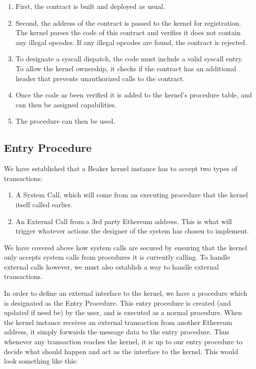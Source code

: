 \documentclass[english,a4paper]{article}
\begin{document}
\begin{enumerate}
\def\labelenumi{\arabic{enumi}.}
\item
  First, the contract is built and deployed as usual.
\item
  Second, the address of the contract is passed to the kernel for registration.
  The kernel parses the code of this contract and verifies it does not contain
  any illegal opcodes. If any illegal opcodes are found, the contract is
  rejected.
\item
  To designate a syscall dispatch, the code must include a valid syscall
  entry. To allow the kernel ownership, it checks if the contract has an
  additional header that prevents unauthorized calls to the contract.
\item
  Once the code as been verified it is added to the kernel's procedure table,
  and can then be assigned capabilities.
\item
  The procedure can then be used.
\end{enumerate}

\subsection{Entry Procedure}\label{entry-procedure}
We have established that a Beaker kernel instance has to accept two
types of transactions:

\begin{enumerate}
\def\labelenumi{\arabic{enumi}.}
\item
  A System Call, which will come from an executing procedure that the
  kernel itself called earlier.
\item
  An External Call from a 3rd party Ethereum address. This is what will
  trigger whatever actions the designer of the system has chosen to
  implement.
\end{enumerate}

We have covered above how system calls are secured by ensuring that the
kernel only accepts system calls from procedures it is currently
calling. To handle external calls however, we must also establish a way
to handle external transactions.

In order to define an external interface to the kernel, we have a
procedure which is designated as the Entry Procedure. This entry
procedure is created (and updated if need be) by the user, and is
executed as a normal procedure. When the kernel instance receives an
external transaction from another Ethereum address, it simply forwards
the message data to the entry procedure. Thus whenever any transaction
reaches the kernel, it is up to our entry procedure to decide what
should happen and act as the interface to the kernel. This would look something
like this:
\end{document}
